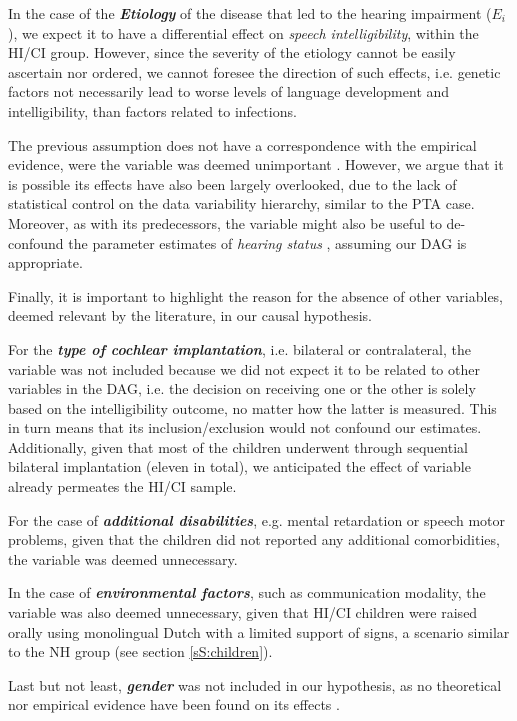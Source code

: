 In the case of the \textbf{\textit{Etiology}} of the disease that led to the hearing impairment ($E_{i}$), we expect it to have a differential effect on \textit{speech intelligibility}, within the HI/CI group. However, since the severity of the etiology cannot be easily ascertain nor ordered, we cannot foresee the direction of such effects, i.e. genetic factors not necessarily lead to worse levels of language development and intelligibility, than factors related to infections.

The previous assumption does not have a correspondence with the empirical evidence, were the variable was deemed unimportant \cite{Boonen_et_al_2021}. However, we argue that it is possible its effects have also been largely overlooked, due to the lack of statistical control on the data variability hierarchy, similar to the PTA case. Moreover, as with its predecessors, the variable might also be useful to de-confound the parameter estimates of \textit{hearing status} \cite{Cinelli_et_al_2021}, assuming our DAG is appropriate.

Finally, it is important to highlight the reason for the absence of other variables, deemed relevant by the literature, in our causal hypothesis.

For the \textbf{\textit{type of cochlear implantation}}, i.e. bilateral or contralateral, the variable was not included because we did not expect it to be related to other variables in the DAG, i.e. the decision on receiving one or the other is solely based on the intelligibility outcome, no matter how the latter is measured. This in turn means that its inclusion/exclusion would not confound our estimates. Additionally, given that most of the children underwent through sequential bilateral implantation (eleven in total), we anticipated the effect of variable already permeates the HI/CI sample.

For the case of \textbf{\textit{additional disabilities}}, e.g. mental retardation or speech motor problems, given that the children did not reported any additional comorbidities, the variable was deemed unnecessary.

In the case of \textbf{\textit{environmental factors}}, such as communication modality, the variable was also deemed unnecessary, given that HI/CI children were raised orally using monolingual Dutch with a limited support of signs, a scenario similar to the NH group (see section \ref{sS:children}).

Last but not least, \textbf{\textit{gender}} was not included in our hypothesis, as no theoretical nor empirical evidence have been found on its effects \cite{Boonen_et_al_2021}.

